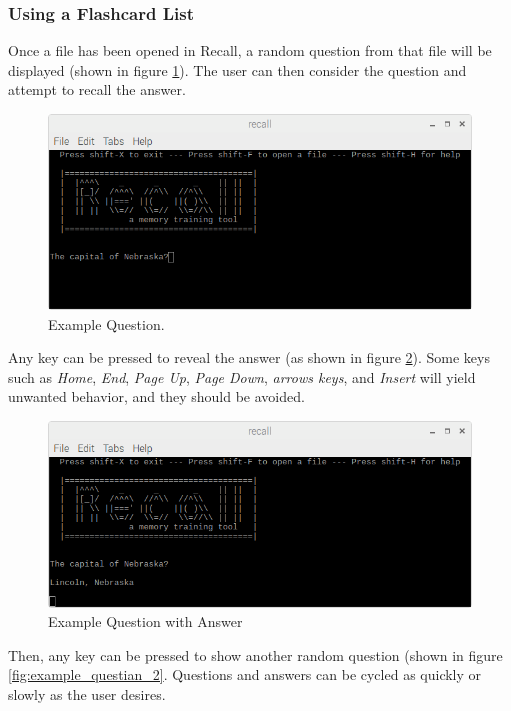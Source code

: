 \documentclass[letterpaper]{article}
\begin{document}
\subsubsection{Using a Flashcard List}
Once a file has been opened in Recall, a random question from that file will be displayed (shown in figure \ref{fig:example_questian_1}). The user can then consider the question and attempt to recall the answer.

\begin{figure}[H]
  \centering
  \includegraphics[width=14cm]{images/running/questian1.png}
  \caption{Example Question.}
  \label{fig:example_questian_1}
\end{figure}

Any key can be pressed to reveal the answer (as shown in figure \ref{fig:example_answer_1}). Some keys such as \textit{Home}, \textit{End}, \textit{Page Up}, \textit{Page Down}, \textit{arrows keys}, and \textit{Insert} will yield unwanted behavior, and they should be avoided.

\begin{figure}[H]
  \centering
  \includegraphics[width=14cm]{images/running/questian1_with_answer.png}
  \caption{Example Question with Answer}
  \label{fig:example_answer_1}
\end{figure}

Then, any key can be pressed to show another random question (shown in figure \ref{fig:example_questian_2}. Questions and answers can be cycled as quickly or slowly as the user desires.
\end{document}
